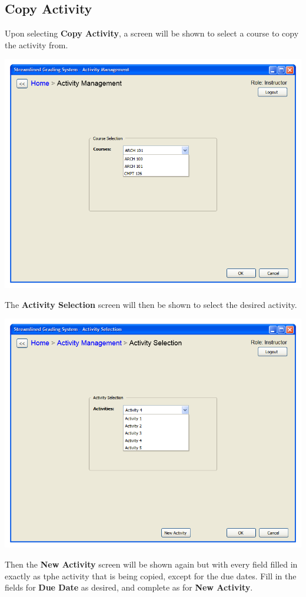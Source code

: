 \documentclass{article}
\begin{document}
\subsection{Copy Activity}
Upon selecting \textbf{Copy Activity}, a screen will be shown to select a course to copy 
the activity from.
\begin{center} 
   \includegraphics[scale=0.55]{../images/UIMockups/pngs/CourseSelectionAM}
\end{center}
The \textbf{Activity Selection} screen will then be shown to select the desired activity.
\begin{center} 
   \includegraphics[scale=0.55]{../images/UIMockups/pngs/ActivitySelectionAM}
\end{center}
Then the \textbf{New Activity} screen will be shown again but with every field filled in 
exactly as tphe activity that is being copied, except for the due dates. Fill in the fields 
for \textbf{Due Date} as desired, and complete as for \textbf{New Activity}.
\end{document}
